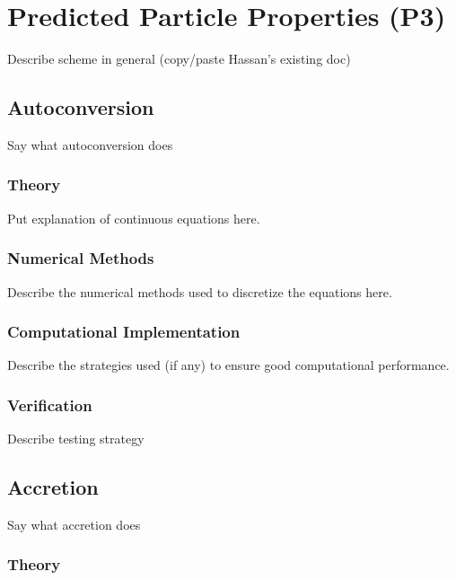 \section{Predicted Particle Properties (P3)}

Describe scheme in general (copy/paste Hassan's existing doc)

\subsection{Autoconversion}

Say what autoconversion does

\subsubsection{Theory}

Put explanation of continuous equations here.

\subsubsection{Numerical Methods}

Describe the numerical methods used to discretize the equations here.

\subsubsection{Computational Implementation}

Describe the strategies used (if any) to ensure good computational performance.

\subsubsection{Verification}

Describe testing strategy

\subsection{Accretion}

Say what accretion does

\subsubsection{Theory}

